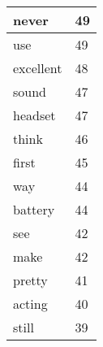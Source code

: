 \documentclass{article}
\begin{document}
\begin{table}[htbp]
\begin{center}
\begin{tabular}{|m{12em}|m{5em}|}
\hline
never & 49 \\
\hline
use & 49 \\
\hline
excellent & 48 \\
\hline
sound & 47 \\
\hline
headset & 47 \\
\hline
think & 46 \\
\hline
first & 45 \\
\hline
way & 44 \\
\hline
battery & 44 \\
\hline
see & 42 \\
\hline
make & 42 \\
\hline
pretty & 41 \\
\hline
acting & 40 \\
\hline
still & 39 \\
\hline

\end{tabular}
\label{tab1}
\end{center}
\end{table}

\setlength{\parindent}{3em}
\setlength{\parskip}{1em}
\renewcommand{\baselinestretch}{2.0}

\thispagestyle{empty}
\end{document}
